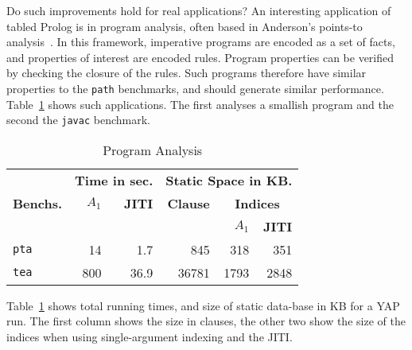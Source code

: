 \documentclass{llncs}
\begin{document}
Do such improvements hold for real applications? An interesting
application of tabled Prolog is in program analysis, often based in
Anderson's points-to analysis~\cite{anderson-phd}. In this framework,
imperative programs are encoded as a set of facts, and properties of
interest are encoded rules. Program properties can be verified by
checking the closure of the rules. Such programs therefore have
similar properties to the \texttt{path} benchmarks, and should
generate similar performance. Table~\ref{tab:pa} shows such
applications. The first analyses a smallish program and the second the
\texttt{javac} benchmark.

\begin{table}[ht]
  \centering
  \begin {tabular}{|l|r|r||r|r|r||} \hline %
    &  \multicolumn{2}{|c||}{\bf Time in sec.}  &
    \multicolumn{3}{|c||}{\bf Static Space in KB.} \\
    {\bf Benchs.}  & \bf $A_1$   & \bf JITI & \bf Clause & \multicolumn{2}{|c||}{\bf Indices} \\
    &    &  &  & \bf $A_1$   & \bf JITI \\
    \hline
    \texttt{pta}    & 14  & 1.7  & 845   & 318  & 351 \\
    \texttt{tea}    & 800 & 36.9 & 36781 & 1793 & 2848 \\
    \hline
\end{tabular}
\caption{Program Analysis}
\label{tab:pa}
\end{table}

Table~\ref{tab:pa} shows total running times, and size of static
data-base in KB for a YAP run. The first column shows the size in
clauses, the other two show the size of the indices when using
single-argument indexing and the JITI.
\end{document}
